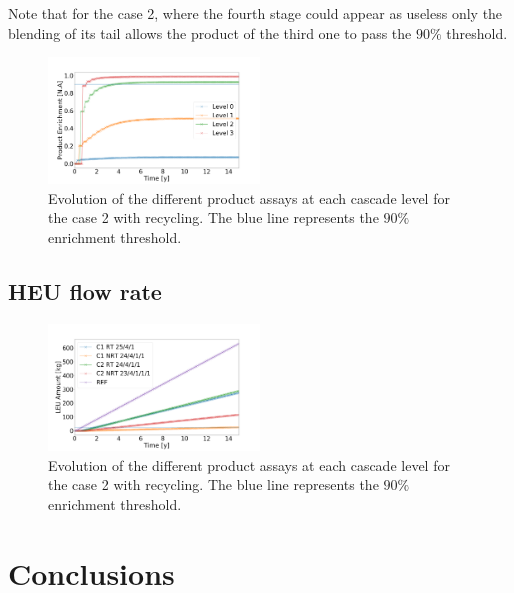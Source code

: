 \documentclass{anstrans}
\begin{document}
Note that for the case 2, where the fourth stage could appear as useless only the
blending of its tail allows the product of the third one to pass the $90\%$ threshold.

\begin{figure}[ht] %
  \centering
  \includegraphics[width=0.5\textwidth]{assay_case_2_rec.png}
  \caption{Evolution of the different product assays at each cascade level for
  the case 2 with recycling. The blue line represents the $90\%$ enrichment
  threshold.}\label{fig:assay_c2_r}
\end{figure}


\subsection{HEU flow rate}

\begin{figure}[ht] %
  \centering
  \includegraphics[width=0.5\textwidth]{HEU_prod.png}
  \caption{Evolution of the different product assays at each cascade level for
  the case 2 with recycling. The blue line represents the $90\%$ enrichment
  threshold.}\label{fig:assay_c2_r}
\end{figure}

\section{Conclusions}
\end{document}
